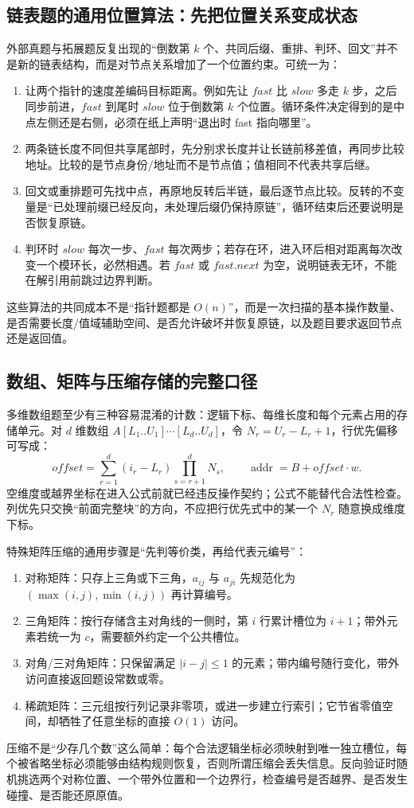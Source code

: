 \documentclass[UTF8,fontset=none,11pt,a4paper]{ctexart}
\begin{document}
\subsection{链表题的通用位置算法：先把位置关系变成状态}
外部真题与拓展题反复出现的“倒数第 $k$ 个、共同后缀、重排、判环、回文”并不是新的链表结构，而是对节点关系增加了一个位置约束。可统一为：
\begin{enumerate}
\item {}让两个指针的速度差编码目标距离。例如先让 $fast$ 比 $slow$ 多走 $k$ 步，之后同步前进，$fast$ 到尾时 $slow$ 位于倒数第 $k$ 个位置。循环条件决定得到的是中点左侧还是右侧，必须在纸上声明“退出时 fast 指向哪里”。
\item {}两条链长度不同但共享尾部时，先分别求长度并让长链前移差值，再同步比较地址。比较的是节点身份/地址而不是节点值；值相同不代表共享后继。
\item {}回文或重排题可先找中点，再原地反转后半链，最后逐节点比较。反转的不变量是“已处理前缀已经反向，未处理后缀仍保持原链”，循环结束后还要说明是否恢复原链。
\item {}判环时 $slow$ 每次一步、$fast$ 每次两步；若存在环，进入环后相对距离每次改变一个模环长，必然相遇。若 $fast$ 或 $fast.next$ 为空，说明链表无环，不能在解引用前跳过边界判断。
\end{enumerate}
这些算法的共同成本不是“指针题都是 $O(n)$”，而是一次扫描的基本操作数量、是否需要长度/值域辅助空间、是否允许破坏并恢复原链，以及题目要求返回节点还是返回值。

\subsection{数组、矩阵与压缩存储的完整口径}
多维数组题至少有三种容易混淆的计数：逻辑下标、每维长度和每个元素占用的存储单元。对 $d$ 维数组
$A[L_1..U_1]\cdots[L_d..U_d]$，令 $N_r=U_r-L_r+1$，行优先偏移可写成：
\[
offset=\sum_{r=1}^{d}(i_r-L_r)\prod_{s=r+1}^{d}N_s,
\qquad \operatorname{addr}=B+offset\cdot w.
\]
空维度或越界坐标在进入公式前就已经违反操作契约；公式不能替代合法性检查。列优先只交换“前面完整块”的方向，不应把行优先式中的某一个 $N_r$ 随意换成维度下标。

特殊矩阵压缩的通用步骤是“先判等价类，再给代表元编号”：
\begin{enumerate}
\item 对称矩阵：只存上三角或下三角，$a_{ij}$ 与 $a_{ji}$ 先规范化为 $(\max(i,j),\min(i,j))$ 再计算编号。
\item 三角矩阵：按行存储含主对角线的一侧时，第 $i$ 行累计槽位为 $i+1$；带外元素若统一为 $c$，需要额外约定一个公共槽位。
\item 对角/三对角矩阵：只保留满足 $|i-j|\le 1$ 的元素；带内编号随行变化，带外访问直接返回题设常数或零。
\item 稀疏矩阵：三元组按行列记录非零项，或进一步建立行索引；它节省零值空间，却牺牲了任意坐标的直接 $O(1)$ 访问。
\end{enumerate}
压缩不是“少存几个数”这么简单：每个合法逻辑坐标必须映射到唯一独立槽位，每个被省略坐标必须能够由结构规则恢复，否则所谓压缩会丢失信息。反向验证时随机挑选两个对称位置、一个带外位置和一个边界行，检查编号是否越界、是否发生碰撞、是否能还原原值。
\end{document}
